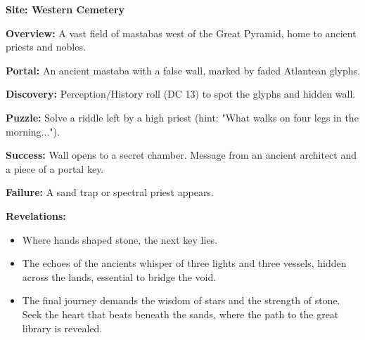 \documentclass[12pt]{article}
\begin{document}
\textbf{Site: Western Cemetery}

\textbf{Overview:}  
A vast field of mastabas west of the Great Pyramid, home to ancient priests and nobles.

\textbf{Portal:}  
An ancient mastaba with a false wall, marked by faded Atlantean glyphs.

\textbf{Discovery:}  
Perception/History roll (DC 13) to spot the glyphs and hidden wall.

\textbf{Puzzle:}  
Solve a riddle left by a high priest (hint: "What walks on four legs in the morning...").

\textbf{Success:}  
Wall opens to a secret chamber. Message from an ancient architect and a piece of a portal key.

\textbf{Failure:}  
A sand trap or spectral priest appears.

\textbf{Revelations:}
\begin{itemize}
  \item Where hands shaped stone, the next key lies.
  \item The echoes of the ancients whisper of three lights and three vessels, hidden across the lands, essential to bridge the void.
  \item The final journey demands the wisdom of stars and the strength of stone. Seek the heart that beats beneath the sands, where the path to the great library is revealed.
\end{itemize}
\end{document}
